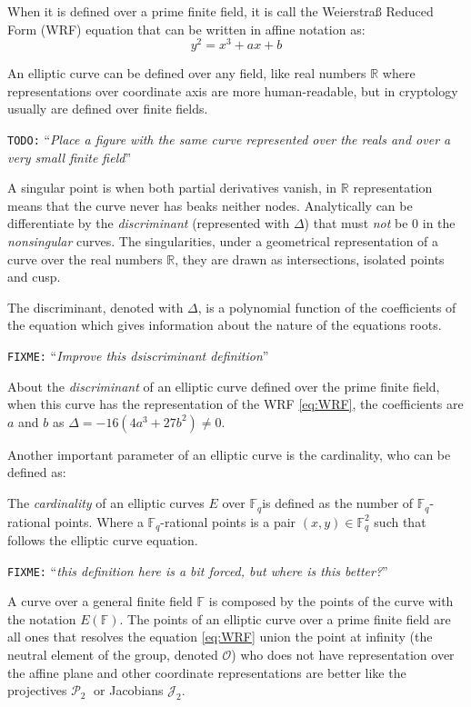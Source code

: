 \documentclass[10pt,a4paper,twoside]{llncs}
\newcommand{\todo}[1]{\texttt{\color{red}TODO:} ``\emph{#1}''}
\newcommand{\fixme}[1]{\texttt{\color{red}FIXME:} ``\emph{#1}''}
\newcommand{\Proy}{\ensuremath{\mathcal{P}_{2}}}%
\newcommand{\Jacob}{\ensuremath{\mathcal{J}_{2}}}%
\newcommand{\Fq}{\ensuremath{\mathbb{F}_q}}%
\newcommand{\PaI}{\ensuremath{\mathcal{O}}}%
\begin{document}
When it is defined over a prime finite field, it is call the Weierstra\ss{} Reduced Form (WRF) equation that can be written in affine notation as:
\begin{equation}\label{eq:WRF}
y^2=x^3+ax+b
\end{equation}

An elliptic curve can be defined over any field, like real numbers $\mathbb{R}$ where representations over coordinate axis are more human-readable, but in cryptology usually are defined over finite fields.

\todo{Place a figure with the same curve represented over the reals and over a very small finite field}

A singular point is when both partial derivatives vanish, in $\mathbb{R}$ representation means that the curve never has beaks neither nodes. Analytically can be differentiate by the \emph{discriminant} (represented with $\Delta$) that must \emph{not} be 0 in the \emph{nonsingular} curves. The singularities, under a geometrical representation of a curve over the real numbers $\mathbb{R}$, they are drawn as intersections, isolated points and cusp.

\begin{definition}\label{def:discriminant}
 The discriminant, denoted with $\Delta$, is a polynomial function of the coefficients of the equation which gives information about the nature of the equations roots.
\end{definition}
\fixme{Improve this dsiscriminant definition}

About the \emph{discriminant} of an elliptic curve defined over the prime finite field, when this curve has the representation of the WRF \ref{eq:WRF}, the coefficients are $a$ and $b$ as $\Delta = -16(4a^3+27b^2)\ne 0$.

Another important parameter of an elliptic curve is the cardinality, who can be defined as:
\begin{definition}\label{def:cardinality}
 The \emph{cardinality} of an elliptic curves $E$ over \Fq is defined as the number of \Fq-rational points. Where a \Fq-rational points is a pair $(x,y)\in \mathbb{F}_{q}^{2}$ such that follows the elliptic curve equation.
\end{definition}
\fixme{this definition here is a bit forced, but where is this better?}

A curve over a general finite field $\mathbb{F}$ is composed by the points of the curve with the notation $E\left(\mathbb{F}\right)$. The points of an elliptic curve over a prime finite field are all ones that resolves the equation \ref{eq:WRF} union the point at infinity (the neutral element of the group, denoted \PaI) who does not have representation over the affine plane and other coordinate representations are better like the projectives \Proy $\;$ or Jacobians \Jacob.
\end{document}
